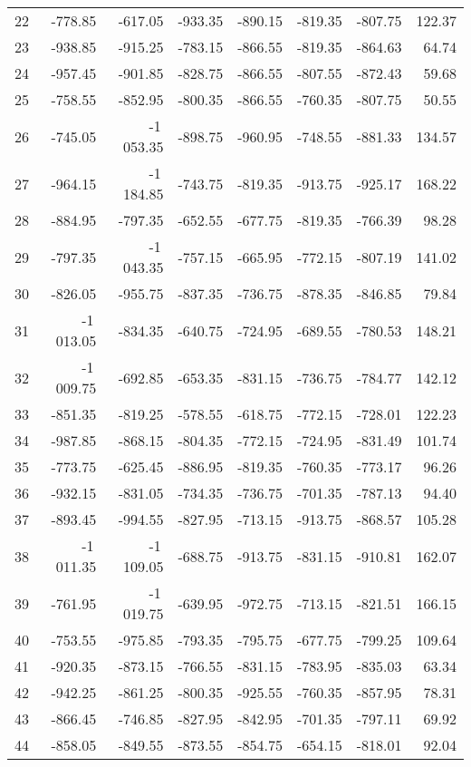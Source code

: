 \begin{longtable}{rrrrrrrr}
22 & -778.85 & -617.05 & -933.35 & -890.15 & -819.35 & -807.75 & 122.37  \\
23 & -938.85 & -915.25 & -783.15 & -866.55 & -819.35 & -864.63 & 64.74  \\
24 & -957.45 & -901.85 & -828.75 & -866.55 & -807.55 & -872.43 & 59.68  \\
25 & -758.55 & -852.95 & -800.35 & -866.55 & -760.35 & -807.75 & 50.55  \\
26 & -745.05 & -1\,053.35 & -898.75 & -960.95 & -748.55 & -881.33 & 134.57  \\
27 & -964.15 & -1\,184.85 & -743.75 & -819.35 & -913.75 & -925.17 & 168.22  \\
28 & -884.95 & -797.35 & -652.55 & -677.75 & -819.35 & -766.39 & 98.28  \\
29 & -797.35 & -1\,043.35 & -757.15 & -665.95 & -772.15 & -807.19 & 141.02  \\
30 & -826.05 & -955.75 & -837.35 & -736.75 & -878.35 & -846.85 & 79.84  \\
31 & -1\,013.05 & -834.35 & -640.75 & -724.95 & -689.55 & -780.53 & 148.21  \\
32 & -1\,009.75 & -692.85 & -653.35 & -831.15 & -736.75 & -784.77 & 142.12  \\
33 & -851.35 & -819.25 & -578.55 & -618.75 & -772.15 & -728.01 & 122.23  \\
34 & -987.85 & -868.15 & -804.35 & -772.15 & -724.95 & -831.49 & 101.74  \\
35 & -773.75 & -625.45 & -886.95 & -819.35 & -760.35 & -773.17 & 96.26  \\
36 & -932.15 & -831.05 & -734.35 & -736.75 & -701.35 & -787.13 & 94.40  \\
37 & -893.45 & -994.55 & -827.95 & -713.15 & -913.75 & -868.57 & 105.28  \\
38 & -1\,011.35 & -1\,109.05 & -688.75 & -913.75 & -831.15 & -910.81 & 162.07  \\
39 & -761.95 & -1\,019.75 & -639.95 & -972.75 & -713.15 & -821.51 & 166.15  \\
40 & -753.55 & -975.85 & -793.35 & -795.75 & -677.75 & -799.25 & 109.64  \\
41 & -920.35 & -873.15 & -766.55 & -831.15 & -783.95 & -835.03 & 63.34  \\
42 & -942.25 & -861.25 & -800.35 & -925.55 & -760.35 & -857.95 & 78.31  \\
43 & -866.45 & -746.85 & -827.95 & -842.95 & -701.35 & -797.11 & 69.92  \\
44 & -858.05 & -849.55 & -873.55 & -854.75 & -654.15 & -818.01 & 92.04  \\

\end{longtable}
